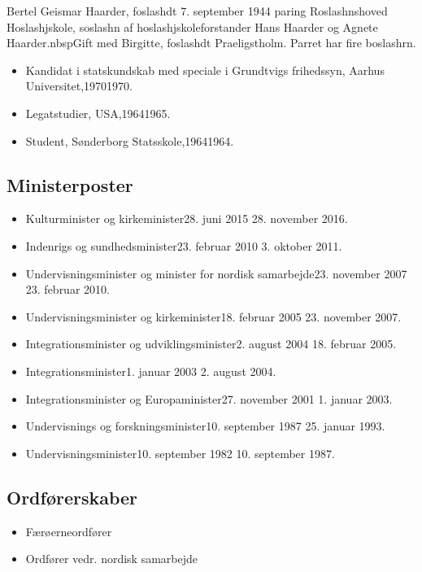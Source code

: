 \documentclass[11pt, a4paper]{awesome-cv}
\begin{document}
\makecvheader[R]
\makelettertitle
\begin{cvletter}
Bertel Geismar Haarder, foslashdt 7. september 1944 paring Roslashnshoved Hoslashjskole, soslashn af hoslashjskoleforstander Hans Haarder og Agnete Haarder.nbspGift med Birgitte, foslashdt Praeligstholm. Parret har fire boslashrn.

\begin{itemize}
\item Kandidat i statskundskab med speciale i Grundtvigs frihedssyn, Aarhus Universitet,19701970.
\item Legatstudier, USA,19641965.
\item Student, Sønderborg Statsskole,19641964.
\end{itemize}
\subsection*{Ministerposter}
\begin{itemize}
\item Kulturminister og kirkeminister28. juni 2015  28. november 2016.
\item Indenrigs og sundhedsminister23. februar 2010  3. oktober 2011.
\item Undervisningsminister og minister for nordisk samarbejde23. november 2007  23. februar 2010.
\item Undervisningsminister og kirkeminister18. februar 2005  23. november 2007.
\item Integrationsminister og udviklingsminister2. august 2004  18. februar 2005.
\item Integrationsminister1. januar 2003  2. august 2004.
\item Integrationsminister og Europaminister27. november 2001  1. januar 2003.
\item Undervisnings og forskningsminister10. september 1987  25. januar 1993.
\item Undervisningsminister10. september 1982  10. september 1987.
\end{itemize}
\subsection*{Ordførerskaber}
\begin{itemize}
\item Færøerneordfører
\item Ordfører vedr. nordisk samarbejde
\end{itemize}

\end{cvletter}
\end{document}
